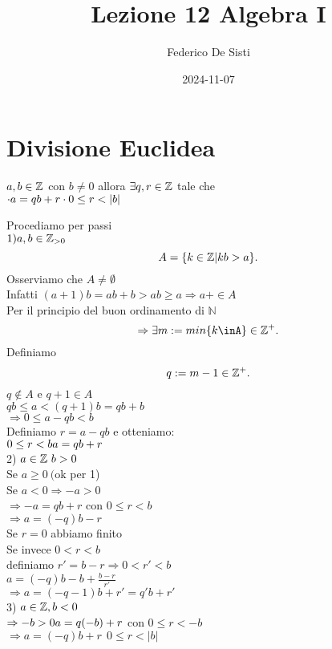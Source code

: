 \documentclass[12px]{article}
\title{Lezione 12 Algebra I}
\date{2024-11-07}
\author{Federico De Sisti}
\begin{document}
	\maketitle
	\newpage
	\section{Divisione Euclidea}
	\begin{teo}
		$a,b\in\mathbb{Z}$ con  $b\neq 0$ allora $\exists q,r\in \mathbb{Z}$ tale che \\
		$	\cdot a = qb+r\\
			\cdot 0\leq r< |b|$
	\end{teo}
	\begin{dimo}
		Procediamo per passi\\
		$1) a,b\in \mathbb{Z}_{>0}$
		 \[
			 A = \{k\in\mathbb{Z} | kb>a\}
		.\] 
		Osserviamo che $A\neq \emptyset$\\
		Infatti  $(a+1)b=ab+b>ab\geq a \Rightarrow a + \in A$ \\
		Per il principio del buon ordinamento di $\mathbb N$
		 \[
		 \Rightarrow \exists m := min\{k\inA\}\in\Z^+
		.\] 
		Definiamo 
		\[
		q:=m-1\in \mathbb{Z}^+
		.\] 
		$q\not\in A$ e $q+1\in A$\\
		 $qb\leq a < (q+1)b=qb + b$ \\
		 $ \Rightarrow 0\leq a - qb < b$ \\
		 Definiamo $r = a - qb$ e otteniamo:\\
		  $0\leq r < b\\
		  a = qb + r$\\
		  2)  $a\in\mathbb{Z}\ b > 0$\\
		  Se  $a\geq 0 \ ($ok per 1)\\
		  Se  $a < 0 \Rightarrow - a > 0$ \\
		  $ \Rightarrow -a = qb + r$ con $0\leq r< b$\\
		   $ \Rightarrow a = (-q)b - r$ \\
		   Se $r = 0$ abbiamo finito \\
		   Se invece $0 < r < b$\\
		   definiamo  $r' = b-r \Rightarrow 0 < r' < b$ \\
		   $a = (-q)b - b + \frac{b-r}{r'}$\\
		    $ \Rightarrow a = (-q-1)b + r' = q'b + r'$\\
		    3) $a\in\mathbb{Z}, b < 0$\\
		     $ \Rightarrow -b > 0\\
		     a = q(-b) + r$ con $0\leq r<-b$\\
		      $ \Rightarrow a = (-q)b + r \ \ 0\leq r < |b|$
	\end{dimo}
	\newpage
\end{document}
